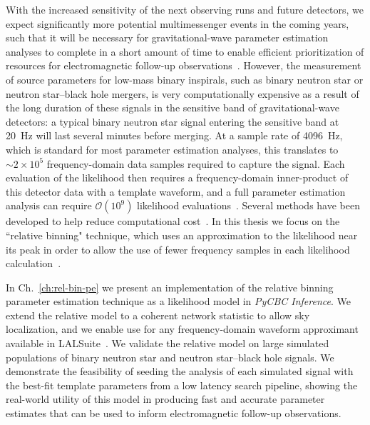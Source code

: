 With the increased sensitivity of the next observing runs and future detectors, we expect significantly more potential multimessenger events in the coming years, such that it will be necessary for gravitational-wave parameter estimation analyses to complete in a short amount of time to enable efficient prioritization of resources for electromagnetic follow-up observations~\cite{Margalit:2019dpi}. However, the measurement of source parameters for low-mass binary inspirals, such as binary neutron star or neutron star--black hole mergers, is very computationally expensive as a result of the long duration of these signals in the sensitive band of gravitational-wave detectors: a typical binary neutron star signal entering the sensitive band at 20~Hz will last several minutes before merging. At a sample rate of 4096~Hz, which is standard for most parameter estimation analyses, this translates to $\sim 2 \times 10^5$ frequency-domain data samples required to capture the signal. Each evaluation of the likelihood then requires a frequency-domain inner-product of this detector data with a template waveform, and a full parameter estimation analysis can require $\mathcal{O}(10^9)$ likelihood evaluations~\cite{Biwer:2018osg}. Several methods have been developed to help reduce computational cost~\cite{Purrer:2014fza,Canizares:2014fya,Blackman:2014maa,Purrer:2015tud,Field:2013cfa,Caudill:2011kv,Field:2011mf,Canizares:2013ywa,Blackman:2015pia}. In this thesis we focus on the ``relative binning" technique, which uses an approximation to the likelihood near its peak in order to allow the use of fewer frequency samples in each likelihood calculation~\cite{cornish2013fast,Zackay:2018qdy}.

In Ch.~\ref{ch:rel-bin-pe} we present an implementation of the relative binning parameter estimation technique as a likelihood model in \textit{PyCBC Inference}. We extend the relative model to a coherent network statistic to allow sky localization, and we enable use for any frequency-domain waveform approximant available in LALSuite~\cite{2020ascl.soft12021L}. We validate the relative model on large simulated populations of binary neutron star and neutron star--black hole signals. We demonstrate the feasibility of seeding the analysis of each simulated signal with the best-fit template parameters from a low latency search pipeline, showing the real-world utility of this model in producing fast and accurate parameter estimates that can be used to inform electromagnetic follow-up observations.

